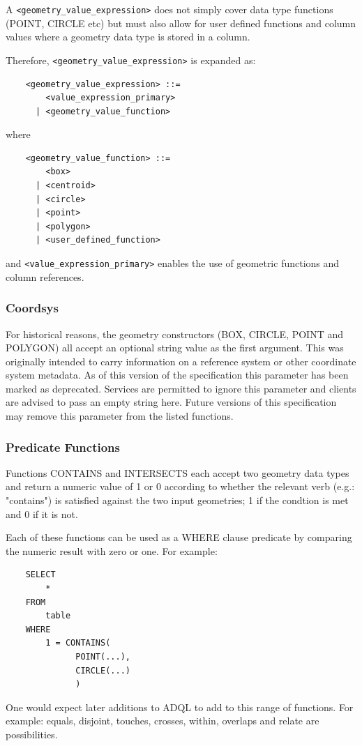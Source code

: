 \documentclass[11pt,a4paper]{ivoa}
\begin{document}
A \verb:<geometry_value_expression>: does not simply cover data type functions
(POINT, CIRCLE etc) but must also allow for user defined functions and
column values where a geometry data type is stored in a column.

Therefore, \verb:<geometry_value_expression>: is expanded as:
\begin{verbatim}
    <geometry_value_expression> ::= 
        <value_expression_primary>
      | <geometry_value_function>
\end{verbatim}
\noindent
where
\begin{verbatim}
    <geometry_value_function> ::=
        <box>
      | <centroid>
      | <circle>
      | <point>
      | <polygon>
      | <user_defined_function>
\end{verbatim}
and \verb:<value_expression_primary>: enables the use of geometric functions
and column references.

\subsubsection{Coordsys}
\label{sec:functions.geom.coordsys}

For historical reasons, the geometry constructors (BOX, CIRCLE, POINT
and POLYGON) all accept an optional string value as the first argument.
This was originally intended to carry
information on a reference system or other coordinate system metadata.
As of this version of the specification this parameter has been
marked as deprecated. Services are permitted to ignore this parameter and
clients are advised to pass an empty string here. Future versions of this
specification may remove this parameter from the listed functions.

\subsubsection{Predicate Functions}
\label{sec:functions.geom.predicate}

Functions CONTAINS and INTERSECTS each accept two geometry data types
and return a numeric value of 1 or 0 according to whether the relevant
verb (e.g.: "contains") is satisfied against the two input geometries;
1 if the condtion is met and 0 if it is not.

Each of these functions can be used as a WHERE clause predicate by
comparing the numeric result with zero or one.
For example:
\begin{verbatim}
    SELECT
        *
    FROM
        table
    WHERE
        1 = CONTAINS(
              POINT(...),
              CIRCLE(...)
              )
\end{verbatim}
\noindent
One would expect later additions to ADQL to add to this range of functions. For
example: equals, disjoint, touches, crosses, within, overlaps and relate
are possibilities.
\end{document}
